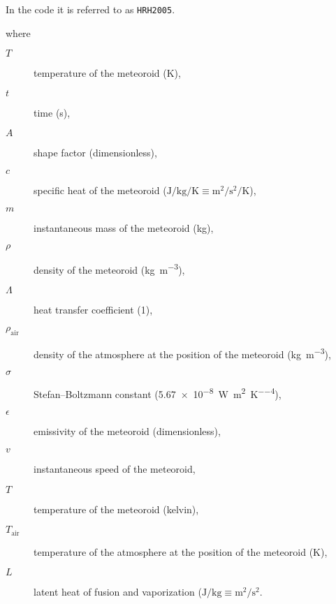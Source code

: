         In the code it is referred to as \texttt{HRH2005}.

        where
        \begin{description}
            \item[$T$]
                temperature of the meteoroid ($\mathrm{K}$),
            \item[$t$]
                time (\si{\second}),
            \item[$A$]
                shape factor (dimensionless),
            \item[$c$]
                specific heat of the meteoroid ($\si{\joule\per\kilo\gram\per\kelvin} \equiv \si{\metre\squared\per\second\squared\per\kelvin}$),
            \item[$m$]
                instantaneous mass of the meteoroid (\si{\kilo\gram}),
            \item[$\rho$]
                density of the meteoroid (\si{\kilo\gram\per\metre\cubed}),
            \item[$\Lambda$]
                heat transfer coefficient (\si{1}),
            \item[$\rho_\mathrm{air}$]
                density of the atmosphere at the position of the meteoroid (\si{\kilo\gram\per\metre\cubed}),
            \item[$\sigma$]
                Stefan--Boltzmann constant (\SI{5.67e-8}{\watt\per\metre\squared\per\kelvin\tothe{4}}),
            \item[$\epsilon$]
                emissivity of the meteoroid (dimensionless),
            \item[$v$]
                instantaneous speed of the meteoroid,
            \item[$T$]
                temperature of the meteoroid (\si{kelvin}),
            \item[$T_\mathrm{air}$]
                temperature of the atmosphere at the position of the meteoroid (\si{\kelvin}),
            \item[$L$]
                latent heat of fusion and vaporization ($\si{\joule\per\kilo\gram} \equiv \si{\metre\squared\per\second\squared}$.

        \end{description}

